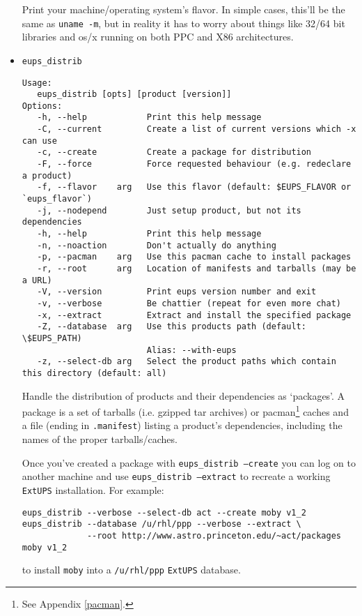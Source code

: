 \documentclass{article}
\newcommand{\code}[1]{\texttt{#1}}
\newcommand{\file}[1]{\texttt{#1}}
\newcommand{\eups}{\code{ExtUPS}}
\begin{document}
\begin{itemize}
Print your machine/operating system's flavor.  In simple cases, this'll
be the same as \code{uname -m}, but in reality it has to worry about things
like 32/64 bit libraries and os/x running on both PPC and X86 architectures.


  \item \code{eups\_distrib}
\begin{verbatim}
Usage:
   eups_distrib [opts] [product [version]]
Options:
   -h, --help            Print this help message
   -C, --current         Create a list of current versions which -x can use
   -c, --create          Create a package for distribution
   -F, --force           Force requested behaviour (e.g. redeclare a product)
   -f, --flavor    arg   Use this flavor (default: $EUPS_FLAVOR or `eups_flavor`)
   -j, --nodepend        Just setup product, but not its dependencies
   -h, --help            Print this help message
   -n, --noaction        Don't actually do anything
   -p, --pacman    arg   Use this pacman cache to install packages
   -r, --root      arg   Location of manifests and tarballs (may be a URL)
   -V, --version         Print eups version number and exit
   -v, --verbose         Be chattier (repeat for even more chat)
   -x, --extract         Extract and install the specified package
   -Z, --database  arg   Use this products path (default: \$EUPS_PATH)
                         Alias: --with-eups
   -z, --select-db arg   Select the product paths which contain this directory (default: all)
\end{verbatim} %

Handle the distribution of products and their dependencies as `packages'. A
package is a set of tarballs (i.e. gzipped tar archives) or pacman\footnote{%
  See Appendix \ref{pacman}.
}
caches and
a file (ending in \code{.manifest})
listing a product's dependencies, including the names of the proper tarballs/caches. 

Once you've created a package with \code{eups\_distrib --create} you can log on to
another machine and use \code{eups\_distrib --extract} to
recreate a working \eups{} installation.  For example:
\begin{verbatim}
eups_distrib --verbose --select-db act --create moby v1_2
eups_distrib --database /u/rhl/ppp --verbose --extract \
             --root http://www.astro.princeton.edu/~act/packages moby v1_2
\end{verbatim}
to install \code{moby} into a \file{/u/rhl/ppp} \eups{} database.


\end{itemize}
\end{document}
